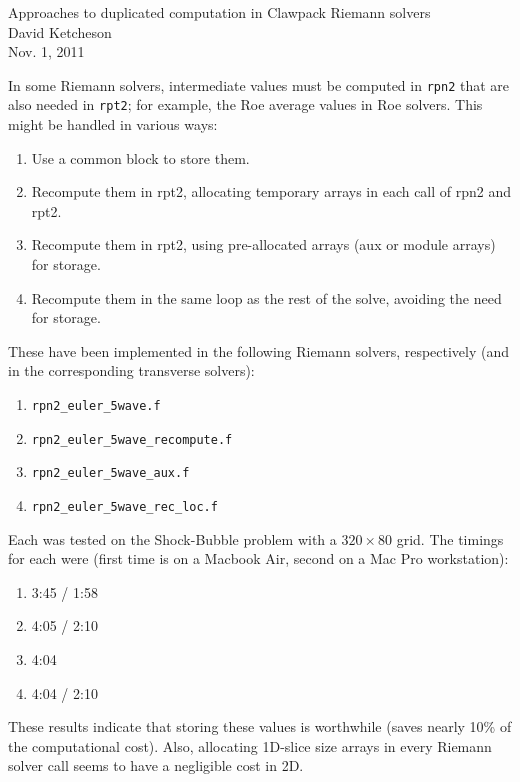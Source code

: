 \documentclass[12pt,english]{article}
\begin{document}
\begin{center}
{\large Approaches to duplicated computation in Clawpack Riemann solvers} \\
David Ketcheson \\
Nov. 1, 2011
\par\end{center}{\large \par}


In some Riemann solvers, intermediate values must be computed in {\tt rpn2}
that are also needed in {\tt rpt2}; for example, the Roe average values in
Roe solvers.  This might be handled in various ways:
\begin{enumerate}
  \item Use a common block to store them.
  \item Recompute them in rpt2, allocating temporary arrays in each call of rpn2 and rpt2.
  \item Recompute them in rpt2, using pre-allocated arrays (aux or module arrays) for storage.
  \item Recompute them in the same loop as the rest of the solve, avoiding the need for storage.
\end{enumerate}
These have been implemented in the following Riemann solvers, respectively (and in the
corresponding transverse solvers):
\begin{enumerate}
  \item \verb=rpn2_euler_5wave.f=
  \item \verb=rpn2_euler_5wave_recompute.f=
  \item \verb=rpn2_euler_5wave_aux.f=
  \item \verb=rpn2_euler_5wave_rec_loc.f=
\end{enumerate}
Each was tested on the Shock-Bubble problem with a $320 \times 80$ grid.  The timings for each
were (first time is on a Macbook Air, second on a Mac Pro workstation):
\begin{enumerate}
  \item 3:45 / 1:58
  \item 4:05 / 2:10
  \item 4:04
  \item 4:04 / 2:10
\end{enumerate}
These results indicate that storing these values is worthwhile (saves nearly 10\% of the
computational cost).  Also, allocating 1D-slice size arrays in every Riemann solver call
seems to have a negligible cost in 2D.
\end{document}
